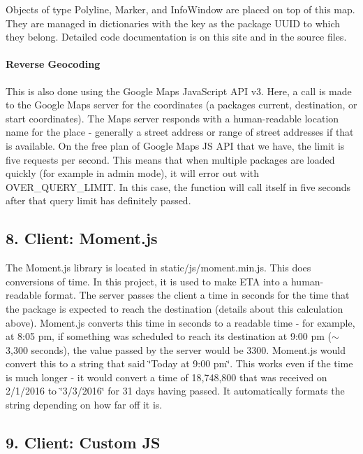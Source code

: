 Objects of type {\ttfamily Polyline}, {\ttfamily Marker}, and {\ttfamily Info\+Window} are placed on top of this map. They are managed in dictionaries with the key as the package U\+U\+ID to which they belong. Detailed code documentation is on this site and in the source files.

\paragraph*{Reverse Geocoding}

This is also done using the Google Maps Java\+Script A\+PI v3. Here, a call is made to the Google Maps server for the coordinates (a package\textquotesingle{}s current, destination, or start coordinates). The Maps server responds with a human-\/readable location name for the place -\/ generally a street address or range of street addresses if that is available. On the free plan of Google Maps JS A\+PI that we have, the limit is five requests per second. This means that when multiple packages are loaded quickly (for example in admin mode), it will error out with {\ttfamily O\+V\+E\+R\+\_\+\+Q\+U\+E\+R\+Y\+\_\+\+L\+I\+M\+IT}. In this case, the function will call itself in five seconds after that query limit has definitely passed.

\subsection*{8. Client\+: Moment.\+js}

The Moment.\+js library is located in {\ttfamily static/js/moment.\+min.\+js}. This does conversions of time. In this project, it is used to make E\+TA into a human-\/readable format. The server passes the client a time in seconds for the time that the package is expected to reach the destination (details about this calculation above). Moment.\+js converts this time in seconds to a readable time -\/ for example, at 8\+:05 pm, if something was scheduled to reach its destination at 9\+:00 pm ($\sim$3,300 seconds), the value passed by the server would be 3300. Moment.\+js would convert this to a string that said \char`\"{}\+Today at 9\+:00 pm\char`\"{}. This works even if the time is much longer -\/ it would convert a time of 18,748,800 that was received on 2/1/2016 to \char`\"{}3/3/2016\char`\"{} for 31 days having passed. It automatically formats the string depending on how far off it is.

\subsection*{9. Client\+: Custom JS}

